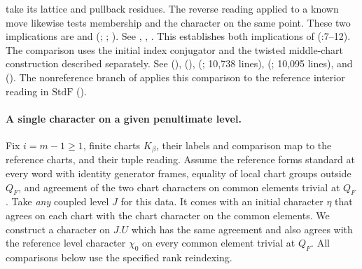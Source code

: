 take its lattice and pullback residues. The reverse reading applied
to a known move likewise tests membership and the character on the
same point. These two implications are  and
 (;
; ).
See ,
,
.
This establishes both implications of
(:7--12).
The comparison uses the initial index conjugator and the twisted
middle-chart construction described separately.
See  (),
 (),
(;
10,738 lines), 
(;
10,095 lines), and 
().
The nonreference branch of  applies this comparison
to the reference interior reading in $\mathrm{StdF}$
().

\paragraph{A single character on a given penultimate level.}
Fix $i=m-1\ge1$, finite charts $K_\beta$, their labels and comparison
map to the reference charts, and their tuple reading. Assume the
reference forms standard at every word with identity generator frames,
equality of local chart groups outside $Q_F$, and agreement of the two
chart characters on common elements trivial at $Q_F$. Take
\emph{any} coupled level $J$ for this data. It comes with an initial
character $\eta$ that agrees on each chart with the chart character on
the common elements. We construct a character on $J.U$ which has the
same agreement and also agrees with the reference level character
$\chi_0$ on every common element trivial at $Q_F$.
All comparisons below use the specified rank reindexing.

